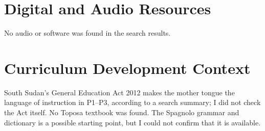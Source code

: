 \documentclass[12pt]{article}
\begin{document}
\section{Digital and Audio Resources}
No audio or software was found in the search results.

\section{Curriculum Development Context}
South Sudan's General Education Act 2012 makes the mother tongue the language of instruction in P1--P3, according to a search summary; I did not check the Act itself. No Toposa textbook was found. The Spagnolo grammar and dictionary is a possible starting point, but I could not confirm that it is available.
\end{document}
